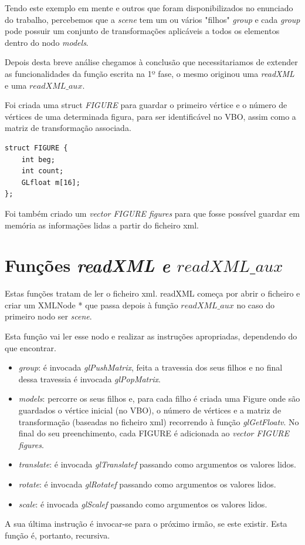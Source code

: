 \documentclass[11pt,a4paper]{report}
\begin{document}
Tendo este exemplo em mente e outros que foram disponibilizados no enunciado do trabalho, percebemos que a \emph{scene} tem um ou vários "filhos" \emph{group} e cada \emph{group} pode possuir um conjunto de transformações aplicáveis a todos os elementos dentro do nodo \emph{models}.

Depois desta breve análise chegamos à conclusão que necessitariamos de extender as funcionalidades da função escrita na 1º fase, o mesmo originou uma \emph{readXML} e uma {$readXML\_aux$}.

Foi criada uma struct \emph{FIGURE} para guardar o primeiro vértice e o número de vértices de uma determinada figura, para ser identificável no VBO, assim como a matriz de transformação associada. 

\begin{lstlisting}[style = code]
struct FIGURE {
	int beg;
	int count;
	GLfloat m[16];
};
\end{lstlisting}
Foi também criado um \emph{vector FIGURE figures} para que fosse possível guardar em memória as informações lidas a partir do ficheiro xml.

\section{Funções \emph{readXML e {$readXML\_aux$} }}

Estas funções tratam de ler o ficheiro xml. readXML começa por abrir o ficheiro e criar um XMLNode * que passa depois à função {$readXML\_aux$} no caso do primeiro nodo ser \emph{scene}. 

Esta função vai ler esse nodo e realizar as instruções apropriadas, dependendo do que encontrar. 
\begin{itemize}
\item \emph{group}: é invocada \emph{glPushMatrix}, feita a travessia dos seus filhos e no final dessa travessia é invocada \emph{glPopMatrix}.
\item \emph{models}: percorre os seus filhos e, para cada filho é criada uma Figure onde são guardados o vértice inicial (no VBO), o número de vértices e a matriz de transformação (baseadas no ficheiro xml) recorrendo à função \emph{glGetFloatv}. No final do seu preenchimento, cada FIGURE é adicionada ao \emph{vector FIGURE figures}.

\item \emph{translate}: é invocada \emph{glTranslatef} passando como argumentos os valores lidos. 
\item \emph{rotate}: é invocada \emph{glRotatef} passando como argumentos os valores lidos.
\item \emph{scale}: é invocada \emph{glScalef} passando como argumentos os valores lidos.
\end{itemize}
A sua última instrução é invocar-se para o próximo irmão, se este existir. Esta função é, portanto, recursiva.
\end{document}
